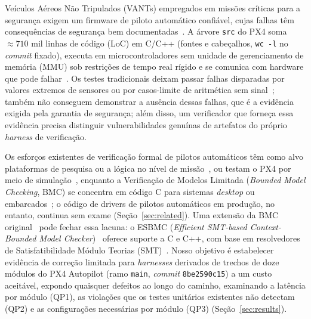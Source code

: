 \documentclass[conference]{IEEEtran}
\begin{document}
Veículos Aéreos Não Tripulados (VANTs) empregados em missões críticas
para a segurança exigem um firmware de piloto automático confiável,
cujas falhas têm consequências de segurança bem
documentadas~\cite{Wanner2024}.
A árvore \texttt{src} do PX4 soma ${\approx}710$ mil linhas de código
(LoC) em C/C++ (fontes e cabeçalhos, \texttt{wc\,-l} no \textit{commit}
fixado), executa em microcontroladores sem unidade de gerenciamento de
memória (MMU) sob restrições de tempo real rígido e se comunica com
hardware que pode falhar~\cite{PX4_GitHub,Wanner2024}.
Os testes tradicionais deixam passar falhas disparadas por valores
extremos de sensores ou por casos-limite de aritmética sem
sinal~\cite{Khatiri2024}; também não conseguem demonstrar a ausência
dessas falhas, que é a evidência exigida pela garantia de segurança;
além disso, um verificador que forneça essa evidência precisa
distinguir vulnerabilidades genuínas de artefatos do próprio
\textit{harness} de verificação.

Os esforços existentes de verificação formal de pilotos automáticos
têm como alvo plataformas de pesquisa ou a lógica no nível de
missão~\cite{Pollien2023,Bernardeschi2023}, ou testam o PX4 por meio
de simulação~\cite{Khatiri2024}, enquanto a Verificação de Modelos
Limitada (\textit{Bounded Model Checking}, BMC) se concentra em
código C para sistemas \textit{desktop} ou embarcados~\cite{Sousa2026};
o código de drivers de pilotos automáticos em produção, no entanto,
continua sem exame (Seção~\ref{sec:related}). Uma extensão da BMC
original~\cite{Biere1999} pode fechar essa lacuna: o ESBMC
(\textit{Efficient SMT-based Context-Bounded Model
Checker})~\cite{Cordeiro2012,Monteiro2022} oferece suporte a C e C++,
com base em resolvedores de Satisfatibilidade Módulo Teorias
(SMT)~\cite{deMoura2008,Niemetz2023}. Nosso objetivo é estabelecer
evidência de correção limitada para \textit{harnesses} derivados de
trechos de doze módulos do PX4 Autopilot (ramo \texttt{main},
\textit{commit} \texttt{8be2590c15}) a um custo aceitável, expondo
quaisquer defeitos ao longo do caminho, examinando a latência por
módulo (QP1), as violações que os testes unitários existentes não
detectam (QP2) e as configurações necessárias por módulo (QP3)
(Seção~\ref{sec:results}).
\end{document}
